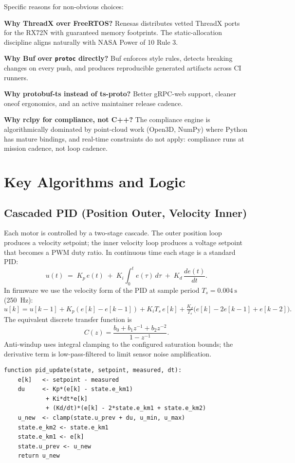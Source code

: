 \documentclass[11pt,letterpaper]{article}
\begin{document}
Specific reasons for non-obvious choices:

\textbf{Why ThreadX over FreeRTOS?} Renesas distributes vetted
ThreadX ports for the RX72N with guaranteed memory footprints. The
static-allocation discipline aligns naturally with NASA Power of 10
Rule 3.

\textbf{Why Buf over \texttt{protoc} directly?} Buf enforces style
rules, detects breaking changes on every push, and produces
reproducible generated artifacts across CI runners.

\textbf{Why protobuf-ts instead of ts-proto?} Better gRPC-web
support, cleaner oneof ergonomics, and an active maintainer
release cadence.

\textbf{Why rclpy for compliance, not C++?} The compliance engine is
algorithmically dominated by point-cloud work (Open3D, NumPy) where
Python has mature bindings, and real-time constraints do not apply:
compliance runs at mission cadence, not loop cadence.

\section{Key Algorithms and Logic}
\label{sec:algorithms}

\subsection{Cascaded PID (Position Outer, Velocity Inner)}
Each motor is controlled by a two-stage cascade. The outer position
loop produces a velocity setpoint; the inner velocity loop produces a
voltage setpoint that becomes a PWM duty ratio. In continuous time
each stage is a standard PID:
\[
  u(t) \;=\; K_p\, e(t) \;+\; K_i \int_0^t e(\tau)\, d\tau
         \;+\; K_d\, \frac{d e(t)}{d t}.
\]
In firmware we use the velocity form of the PID at sample period
$T_s = \qty{0.004}{\second}$ (\qty{250}{\hertz}):
\[
  u[k] = u[k-1] + K_p (e[k] - e[k-1]) + K_i T_s\, e[k]
       + \tfrac{K_d}{T_s} \bigl(e[k] - 2 e[k-1] + e[k-2]\bigr).
\]
The equivalent discrete transfer function is
\[
  C(z) = \frac{b_0 + b_1 z^{-1} + b_2 z^{-2}}{1 - z^{-1}}.
\]
Anti-windup uses integral clamping to the configured saturation
bounds; the derivative term is low-pass-filtered to limit sensor noise
amplification.

\begin{lstlisting}[style=pseudocode, caption={Velocity-form PID update.}, label={lst:pid}]
function pid_update(state, setpoint, measured, dt):
    e[k]   <- setpoint - measured
    du     <- Kp*(e[k] - state.e_km1)
            + Ki*dt*e[k]
            + (Kd/dt)*(e[k] - 2*state.e_km1 + state.e_km2)
    u_new  <- clamp(state.u_prev + du, u_min, u_max)
    state.e_km2 <- state.e_km1
    state.e_km1 <- e[k]
    state.u_prev <- u_new
    return u_new
\end{lstlisting}
\end{document}
